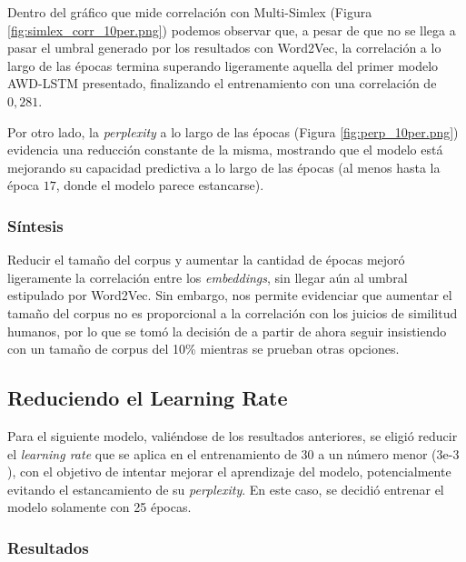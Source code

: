 Dentro del gráfico que mide correlación con Multi-Simlex (Figura \ref{fig:simlex_corr_10per.png}) podemos observar que, 
a pesar de que no se llega a pasar el umbral generado por los resultados con Word2Vec, la 
correlación a lo largo de las épocas termina superando ligeramente aquella del primer 
modelo AWD-LSTM presentado, finalizando el entrenamiento con una correlación de $0,281$.

Por otro lado, la \textit{perplexity} a lo largo de las épocas (Figura \ref{fig:perp_10per.png}) 
evidencia una reducción constante de la misma, mostrando que el modelo está mejorando su 
capacidad predictiva a lo largo de las épocas (al menos hasta la época $17$, donde el 
modelo parece estancarse).

\subsubsection{Síntesis}

Reducir el tamaño del corpus y aumentar la cantidad de épocas mejoró ligeramente la 
correlación entre los \textit{embeddings}, sin llegar aún al umbral estipulado por Word2Vec. 
Sin embargo, nos permite evidenciar que aumentar el tamaño del corpus no es 
proporcional a la correlación con los juicios de similitud humanos, por lo que 
se tomó la decisión de a partir de ahora seguir insistiendo con un tamaño de 
corpus del 10\% mientras se prueban otras opciones.

\subsection{Reduciendo el Learning Rate}

Para el siguiente modelo, valiéndose de los resultados anteriores, se eligió reducir el 
\textit{learning rate} que se aplica en el entrenamiento de $30$ a un número menor 
($3\text{e-3}$), con el objetivo de intentar mejorar el aprendizaje del modelo, 
potencialmente evitando el estancamiento de su \textit{perplexity}. En este caso, se decidió 
entrenar el modelo solamente con 25 épocas.

\subsubsection{Resultados}

